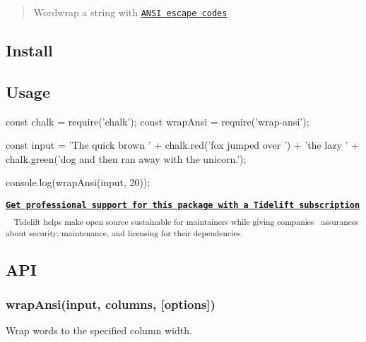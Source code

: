 \begin{quote}
Wordwrap a string with \href{https://en.wikipedia.org/wiki/ANSI_escape_code#Colors_and_Styles}{\tt A\+N\+SI escape codes} \end{quote}


\subsection*{Install}




\subsection*{Usage}


\begin{DoxyCode}
const chalk = require('chalk');
const wrapAnsi = require('wrap-ansi');

const input = 'The quick brown ' + chalk.red('fox jumped over ') +
    'the lazy ' + chalk.green('dog and then ran away with the unicorn.');

console.log(wrapAnsi(input, 20));
\end{DoxyCode}


 



 {\bfseries  \href{https://tidelift.com/subscription/pkg/npm-wrap_ansi?utm_source=npm-wrap-ansi&utm_medium=referral&utm_campaign=readme}{\tt Get professional support for this package with a Tidelift subscription} } ~\newline
 \textsubscript{ Tidelift helps make open source sustainable for maintainers while giving companies~\newline
assurances about security, maintenance, and licensing for their dependencies. }  



\subsection*{A\+PI}

\subsubsection*{wrap\+Ansi(input, columns, \mbox{[}options\mbox{]})}

Wrap words to the specified column width.

